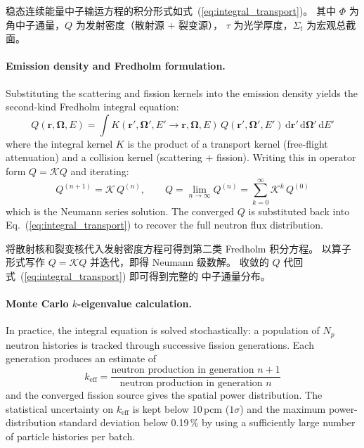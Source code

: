\documentclass[11pt,a4paper]{article}
\newcommand{\keff}{\ensuremath{k_{\mathrm{eff}}}}
\begin{document}
稳态连续能量中子输运方程的积分形式如式~(\ref{eq:integral_transport})。
其中 $\Phi$ 为角中子通量，$Q$ 为发射密度（散射源 $+$ 裂变源），
$\tau$ 为光学厚度，$\Sigma_t$ 为宏观总截面。

\paragraph{Emission density and Fredholm formulation.}
Substituting the scattering and fission kernels into the emission
density yields the second-kind Fredholm integral equation:
\begin{equation}
Q(\mathbf{r},\boldsymbol{\Omega},E)
= \int K(\mathbf{r}',\boldsymbol{\Omega}',E'
        \to \mathbf{r},\boldsymbol{\Omega},E)\,
  Q(\mathbf{r}',\boldsymbol{\Omega}',E')\,
  \mathrm{d}\mathbf{r}'\,\mathrm{d}\boldsymbol{\Omega}'\,\mathrm{d}E'
\end{equation}
where the integral kernel $K$ is the product of a transport kernel
(free-flight attenuation) and a collision kernel (scattering $+$
fission). Writing this in operator form $Q = \mathcal{K}Q$ and
iterating:
\begin{equation}
Q^{(n+1)} = \mathcal{K}\,Q^{(n)},
\qquad
Q = \lim_{n\to\infty} Q^{(n)}
  = \sum_{k=0}^{\infty}\mathcal{K}^k\,Q^{(0)}
\end{equation}
which is the Neumann series solution. The converged $Q$ is substituted
back into Eq.~(\ref{eq:integral_transport}) to recover the full neutron
flux distribution.

将散射核和裂变核代入发射密度方程可得到第二类 Fredholm 积分方程。
以算子形式写作 $Q = \mathcal{K}Q$ 并迭代，即得 Neumann 级数解。
收敛的 $Q$ 代回式~(\ref{eq:integral_transport}) 即可得到完整的
中子通量分布。

\paragraph{Monte Carlo $k$-eigenvalue calculation.}
In practice, the integral equation is solved stochastically: a
population of $N_p$ neutron histories is tracked through successive
fission generations. Each generation produces an estimate of
\begin{equation}
k_{\mathrm{eff}}
= \frac{\text{neutron production in generation } n+1}
       {\text{neutron production in generation } n}
\end{equation}
and the converged fission source gives the spatial power distribution.
The statistical uncertainty on \keff{} is kept below 10\,pcm
($1\sigma$) and the maximum power-distribution standard deviation below
0.19\,\% by using a sufficiently large number of particle histories per
batch.
\end{document}
